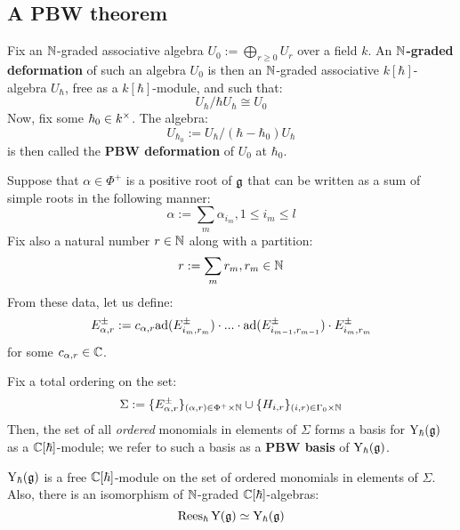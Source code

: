         \subsection{A PBW theorem}
            \begin{definition} \label{def: graded_and_PBW_deformations}
                Fix an $\mathbb{N}$-graded associative algebra $U_0 := \bigoplus_{r \geq 0} U_r$ over a field $k$. An \textbf{$\mathbb{N}$-graded deformation} of such an algebra $U_0$ is then an $\mathbb{N}$-graded associative $k[\hbar]$-algebra $U_{\hbar}$, free as a $k[\hbar]$-module, and such that:
                    $$U_{\hbar}/\hbar U_{\hbar} \cong U_0$$
                Now, fix some $\hbar_0 \in k^{\x}$. The algebra:
                    $$U_{\hbar_0} := U_{\hbar}/(\hbar - \hbar_0)U_{\hbar}$$
                is then called the \textbf{PBW deformation} of $U_0$ at $\hbar_0$.  
            \end{definition}
            \begin{convention}
                Suppose that $\alpha \in \Phi^+$ is a positive root of $\mathfrak{g}$ that can be written as a sum of simple roots in the following manner:
                    $$\alpha := \sum_m \alpha_{i_m}, 1 \leq i_m \leq l$$
                Fix also a natural number $r \in \mathbb{N}$ along with a partition:
                    $$r := \sum_m r_m, r_m \in \mathbb{N}$$
                From these data, let us define:
                    $$E_{\alpha, r}^{\pm} := c_{\alpha, r} \mathrm{ad}( E_{i_m, r_m}^{\pm} ) \cdot ... \cdot \mathrm{ad}( E_{i_{m - 1}, r_{m - 1}}^{\pm} ) \cdot E_{i_m, r_m}^{\pm}$$
                for some $c_{\alpha, r} \in \mathbb{C}$.
            \end{convention}
            \begin{theorem} \label{theorem: PBW_bases_for_formal_yangians}
                Fix a total ordering on the set:
                    $$\Sigma := \{E_{\alpha, r}^{\pm}\}_{(\alpha, r) \in \Phi^+ \x \N} \cup \{H_{i, r}\}_{(i, r) \in \Gamma_0 \x \N}$$
                Then, the set of all \textit{ordered} monomials in elements of $\Sigma$ forms a basis for $\mathrm{Y}_{\hbar}(\mathfrak{g})$ as a $\mathbb{C}[\hbar]$-module; we refer to such a basis as a \textbf{PBW basis} of $\mathrm{Y}_{\hbar}(\mathfrak{g})$. 
            \end{theorem}
            \begin{corollary} \label{coro: formal_yangians_as_graded_deformations}
                $\mathrm{Y}_{\hbar}(\mathfrak{g})$ is a free $\mathbb{C}[\hbar]$-module on the set of ordered monomials in elements of $\Sigma$. Also, there is an isomorphism of $\mathbb{N}$-graded $\mathbb{C}[\hbar]$-algebras:
                    $$\operatorname{Rees}_{\hbar} \mathrm{Y}(\mathfrak{g}) \simeq \mathrm{Y}_{\hbar}(\mathfrak{g})$$
            \end{corollary}

